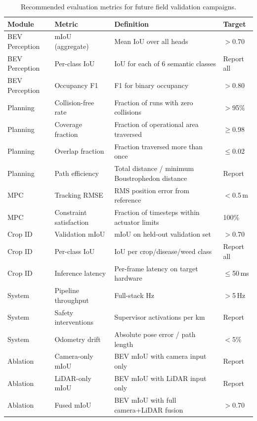 \documentclass[12pt, a4paper]{article}
\begin{document}
\begin{table}[htbp]
\centering
\caption{Recommended evaluation metrics for future field validation campaigns.}
\label{tab:eval_metrics}
\begin{tabularx}{\textwidth}{l X X X}
\toprule
\textbf{Module} & \textbf{Metric} & \textbf{Definition} & \textbf{Target} \\
\midrule
BEV Perception & mIoU (aggregate) & Mean IoU over all heads & $>$0.70 \\
BEV Perception & Per-class IoU & IoU for each of 6 semantic classes & Report all \\
BEV Perception & Occupancy F1 & F1 for binary occupancy & $>$0.80 \\
\addlinespace
Planning & Collision-free rate & Fraction of runs with zero collisions & $>$95\% \\
Planning & Coverage fraction & Fraction of operational area traversed & $\geq$0.98 \\
Planning & Overlap fraction & Fraction traversed more than once & $\leq$0.02 \\
Planning & Path efficiency & Total distance / minimum Boustrophedon distance & Report \\
\addlinespace
MPC & Tracking RMSE & RMS position error from reference & $<$0.5\,m \\
MPC & Constraint satisfaction & Fraction of timesteps within actuator limits & 100\% \\
\addlinespace
Crop ID & Validation mIoU & mIoU on held-out validation set & $>$0.70 \\
Crop ID & Per-class IoU & IoU per crop/disease/weed class & Report all \\
Crop ID & Inference latency & Per-frame latency on target hardware & $\leq$50\,ms \\
\addlinespace
System & Pipeline throughput & Full-stack Hz & $>$5\,Hz \\
System & Safety interventions & Supervisor activations per km & Report \\
System & Odometry drift & Absolute pose error / path length & $<$5\% \\
\addlinespace
Ablation & Camera-only mIoU & BEV mIoU with camera input only & Report \\
Ablation & LiDAR-only mIoU & BEV mIoU with LiDAR input only & Report \\
Ablation & Fused mIoU & BEV mIoU with full camera+LiDAR fusion & $>$0.70 \\
\bottomrule
\end{tabularx}
\end{table}
\end{document}
